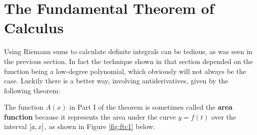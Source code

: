 \section{The Fundamental Theorem of Calculus}\label{sec:ftc}
Using Riemann sums to calculate definite integrals can be tedious, as was seen
in the previous section. In fact the technique shown in that section depended on
the function being a low-degree polynomial, which obviously will not always be
the case. Luckily there is a better way, involving antiderivatives, given by the
following theorem:


The function $A(x)$ in Part I of the theorem is sometimes called the
\textbf{area function} because
it represents the area under the curve $y=f(t)$ over the interval $\lbrack a,x \rbrack$,
as shown in Figure \ref{fig:ftc1} below.

